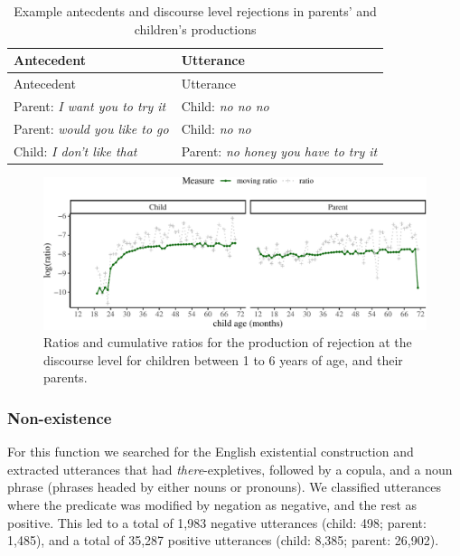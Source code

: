 \documentclass[
  english,
  man,floatsintext]{apa6}
\begin{document}
\begin{longtable}[]{@{}ll@{}}
\caption{\label{tab:disreject} Example antecdents and discourse level rejections in parents' and children's productions}\tabularnewline
\toprule
Antecedent & Utterance \\
\midrule
\endfirsthead
\toprule
Antecedent & Utterance \\
\midrule
\endhead
Parent: \emph{I want you to try it} & Child: \emph{no no no} \\
Parent: \emph{would you like to go} & Child: \emph{no no} \\
Child: \emph{I don't like that} & Parent: \emph{no honey you have to try it} \\
\bottomrule
\end{longtable}

\begin{figure}[H]

{\centering \includegraphics{neg_construction_article_files/figure-latex/emotiondiscourse-1} 

}

\caption{Ratios and cumulative ratios for the production of rejection at the discourse level for children between 1 to 6 years of age, and their parents.}\label{fig:emotiondiscourse}
\end{figure}

\hypertarget{non-existence}{%
\subsubsection{Non-existence}\label{non-existence}}

For this function we searched for the English existential construction and extracted utterances that had \emph{there}-expletives, followed by a copula, and a noun phrase (phrases headed by either nouns or pronouns). We classified utterances where the predicate was modified by negation as negative, and the rest as positive. This led to a total of 1,983 negative utterances (child: 498; parent: 1,485), and a total of 35,287 positive utterances (child: 8,385; parent: 26,902).
\end{document}
